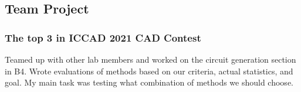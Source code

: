\documentclass[10pt]{article}
\begin{document}
\begin{multicols}{2}
  \subsection*{Team Project}
    \subsubsection*{The top 3 in ICCAD 2021 CAD Contest}
      Teamed up with other lab members and worked on the circuit generation section in B4.
      Wrote evaluations of methods based on our criteria, actual statistics, and goal.
      My main task was testing what combination of methods we should choose.
  \end{multicols}
\end{document}
